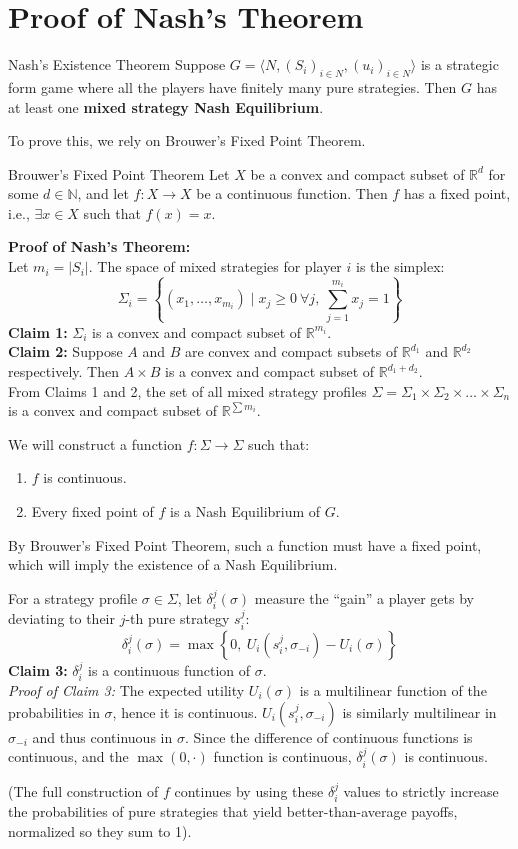 \documentclass[12pt, a4paper]{article}
\begin{document}
\section{Proof of Nash's Theorem}

\begin{thmbox}{Nash's Existence Theorem}
  Suppose $G = \langle N, (S_i)_{i \in N}, (u_i)_{i \in N} \rangle$ is a strategic form game where all the players have finitely many pure strategies. Then $G$ has at least one \textbf{mixed strategy Nash Equilibrium}.
\end{thmbox}

To prove this, we rely on Brouwer's Fixed Point Theorem.

\begin{thmbox}{Brouwer's Fixed Point Theorem}
  Let $X$ be a convex and compact subset of $\mathbb{R}^d$ for some $d \in \mathbb{N}$, and let $f: X \to X$ be a continuous function. Then $f$ has a fixed point, i.e., $\exists x \in X$ such that $f(x) = x$.
\end{thmbox}

\textbf{Proof of Nash's Theorem:} \\
Let $m_i = |S_i|$. The space of mixed strategies for player $i$ is the simplex:
\[
  \Sigma_i = \left\{ (x_1, \dots, x_{m_i}) \mid x_j \geq 0 \ \forall j, \ \sum_{j=1}^{m_i} x_j = 1 \right\}
\]
\textbf{Claim 1:} $\Sigma_i$ is a convex and compact subset of $\mathbb{R}^{m_i}$. \\
\textbf{Claim 2:} Suppose $A$ and $B$ are convex and compact subsets of $\mathbb{R}^{d_1}$ and $\mathbb{R}^{d_2}$ respectively. Then $A \times B$ is a convex and compact subset of $\mathbb{R}^{d_1 + d_2}$. \\
From Claims 1 and 2, the set of all mixed strategy profiles $\Sigma = \Sigma_1 \times \Sigma_2 \times \dots \times \Sigma_n$ is a convex and compact subset of $\mathbb{R}^{\sum m_i}$.

We will construct a function $f: \Sigma \to \Sigma$ such that:
\begin{enumerate}
    \item[(i)] $f$ is continuous.
    \item[(ii)] Every fixed point of $f$ is a Nash Equilibrium of $G$.
\end{enumerate}
By Brouwer's Fixed Point Theorem, such a function must have a fixed point, which will imply the existence of a Nash Equilibrium.

For a strategy profile $\sigma \in \Sigma$, let $\delta_i^j(\sigma)$ measure the ``gain'' a player gets by deviating to their $j$-th pure strategy $s_i^j$:
\[
  \delta_i^j(\sigma) = \max \left\{ 0, \ U_i(s_i^j, \sigma_{-i}) - U_i(\sigma) \right\}
\]
\textbf{Claim 3:} $\delta_i^j$ is a continuous function of $\sigma$. \\
\textit{Proof of Claim 3:} The expected utility $U_i(\sigma)$ is a multilinear function of the probabilities in $\sigma$, hence it is continuous. $U_i(s_i^j, \sigma_{-i})$ is similarly multilinear in $\sigma_{-i}$ and thus continuous in $\sigma$. Since the difference of continuous functions is continuous, and the $\max(0, \cdot)$ function is continuous, $\delta_i^j(\sigma)$ is continuous.

(The full construction of $f$ continues by using these $\delta_i^j$ values to strictly increase the probabilities of pure strategies that yield better-than-average payoffs, normalized so they sum to 1).
\end{document}

